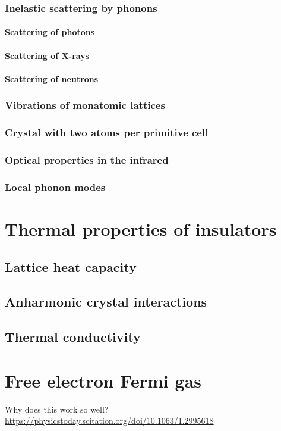 \subsection{Inelastic scattering by phonons}
\subsubsection{Scattering of photons}
\subsubsection{Scattering of X-rays}
\subsubsection{Scattering of neutrons}
\subsection{Vibrations of monatomic lattices}
\subsection{Crystal with two atoms per primitive cell}
\subsection{Optical properties in the infrared}
\subsection{Local phonon modes}

\chapter{Thermal properties of insulators}
\section{Lattice heat capacity}
\section{Anharmonic crystal interactions}
\section{Thermal conductivity}

\chapter{Free electron Fermi gas}
Why does this work so well? \url{https://physicstoday.scitation.org/doi/10.1063/1.2995618}
